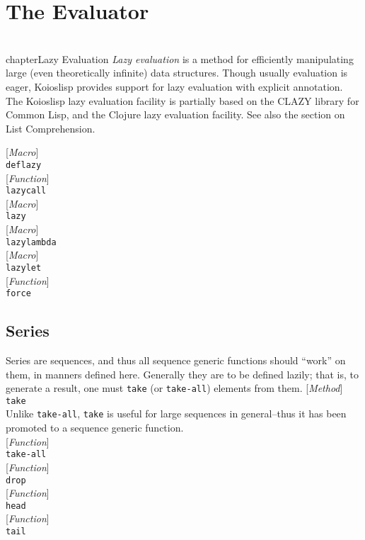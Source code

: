 \documentclass[10pt]{book}
\newenvironment{defother}[2]{[\textit{#1}]\\\texttt{#2}}{\\}
\newenvironment{defun}[1]{\begin{defother}{Function}{#1}}{\end{defother}}
\newenvironment{defmethod}[1]{\begin{defother}{Method}{#1}}{\end{defother}}
\newenvironment{defmacro}[1]{\begin{defother}{Macro}{#1}}{\end{defother}}
\begin{document}
\chapter{The Evaluator}
\\chapter{Lazy Evaluation}
\textit{Lazy evaluation} is a method for efficiently manipulating large (even theoretically infinite) data structures. Though usually evaluation is eager, Koioslisp provides support for lazy evaluation with explicit annotation. The Koioslisp lazy evaluation facility is partially based on the CLAZY library for Common Lisp, and the Clojure lazy evaluation facility. See also the section on List Comprehension. 

\begin{defmacro}{deflazy}\end{defmacro}
\begin{defun}{lazycall}\end{defun} %
\begin{defmacro}{lazy}\end{defmacro} %
\begin{defmacro}{lazylambda}\end{defmacro} %
\begin{defmacro}{lazylet}\end{defmacro}
\begin{defun}{force}\end{defun}
\section{Series}
Series are sequences, and thus all sequence generic functions should ``work'' on them, in manners defined here. Generally they are to be defined lazily; that is, to generate a result, one must \texttt{take} (or \texttt{take-all}) elements from them. 
\begin{defmethod}{take}\\
Unlike \texttt{take-all}, \texttt{take} is useful for large sequences in general--thus it has been promoted to a sequence generic function. 
\end{defmethod}
\begin{defun}{take-all}\end{defun}
\begin{defun}{drop}\end{defun}
\begin{defun}{head}\end{defun}
\begin{defun}{tail}\end{defun}
\end{document}
